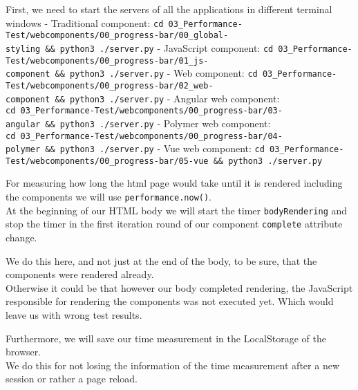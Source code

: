 \documentclass[11pt]{article}
\begin{document}
    

    First, we need to start the servers of all the applications in different
terminal windows - Traditional component:
\texttt{cd\ 03\_Performance-Test/webcomponents/00\_progress-bar/00\_global-styling\ \&\&\ python3\ ./server.py}
- JavaScript component:
\texttt{cd\ 03\_Performance-Test/webcomponents/00\_progress-bar/01\_js-component\ \&\&\ python3\ ./server.py}
- Web component:
\texttt{cd\ 03\_Performance-Test/webcomponents/00\_progress-bar/02\_web-component\ \&\&\ python3\ ./server.py}
- Angular web component:
\texttt{cd\ 03\_Performance-Test/webcomponents/00\_progress-bar/03-angular\ \&\&\ python3\ ./server.py}
- Polymer web component:
\texttt{cd\ 03\_Performance-Test/webcomponents/00\_progress-bar/04-polymer\ \&\&\ python3\ ./server.py}
- Vue web component:
\texttt{cd\ 03\_Performance-Test/webcomponents/00\_progress-bar/05-vue\ \&\&\ python3\ ./server.py}

    For measuring how long the html page would take until it is rendered
including the components we will use \texttt{performance.now()}.\\
At the beginning of our HTML body we will start the timer
\texttt{bodyRendering} and stop the timer in the first iteration round
of our component \texttt{complete} attribute change.

We do this here, and not just at the end of the body, to be sure, that
the components were rendered already.\\
Otherwise it could be that however our body completed rendering, the
JavaScript responsible for rendering the components was not executed
yet. Which would leave us with wrong test results.

Furthermore, we will save our time measurement in the LocalStorage of
the browser.\\
We do this for not losing the information of the time measurement after
a new session or rather a page reload.
\end{document}
